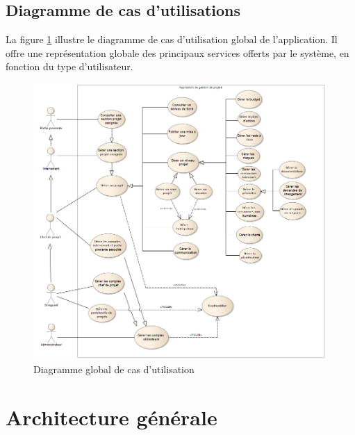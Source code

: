 \begin{spacing}{1.5}
\subsection{Diagramme de cas d'utilisations}
La figure \ref{fig:useCasesDiag} illustre le diagramme de cas d'utilisation global de l'application. Il offre une représentation globale des principaux services offerts par le système, en fonction du type d'utilisateur.

\begin{figure}[H]
\centering
\includegraphics[width=1\linewidth]{useCasesDiag.png}
\caption{Diagramme global de cas d'utilisation}
\label{fig:useCasesDiag}
\end{figure}


\section{Architecture générale}




\end{spacing}

